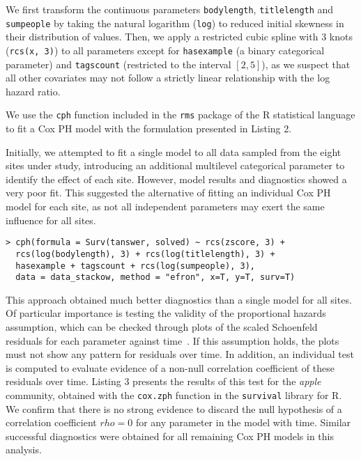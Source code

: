 \documentclass{chi2012}
\begin{document}
We first transform the continuous parameters
\texttt{bodylength}, \texttt{titlelength} and \texttt{sumpeople} by taking the natural 
logarithm (\texttt{log}) to reduced initial skewness in their distribution of values.
Then, we apply a restricted cubic spline with 3 knots (\texttt{rcs(x, 3)}) to all
parameters except for \texttt{hasexample} (a binary categorical parameter) and
\texttt{tagscount} (restricted to the interval $[2, 5]$), as we suspect that all
other covariates may not follow a strictly linear relationship with the log hazard
ratio.

We use the \texttt{cph} function included in the \texttt{rms} package
of the R statistical language to fit a Cox PH model with the 
formulation presented in Listing 2.

Initially, we attempted to fit a single model to all data sampled from the eight sites under study, introducing an additional multilevel categorical parameter to
identify the effect of each site. However, model results and diagnostics showed
a very poor fit. This suggested the alternative of fitting an individual Cox PH
model for each site, as not all independent parameters may exert the same influence
for all sites.

\begin{lstlisting}[breaklines=true,
caption={Model formulation to fit a Cox PH model for each site using the 
\texttt{cph} function in the \texttt{rms} package in R.},
basicstyle=\ttfamily\scriptsize,
frame=lines,
showtabs=false,
showspaces=false,
showstringspaces=false,
captionpos=b]
> cph(formula = Surv(tanswer, solved) ~ rcs(zscore, 3) +
  rcs(log(bodylength), 3) + rcs(log(titlelength), 3) + 
  hasexample + tagscount + rcs(log(sumpeople), 3),
  data = data_stackow, method = "efron", x=T, y=T, surv=T)
\end{lstlisting}

This approach obtained much better diagnostics than a single model for all sites.
Of particular importance is testing the validity of the proportional hazards
assumption, which can be checked through plots of the scaled Schoenfeld
residuals for each parameter against time~\cite{mills2011}. If this assumption
holds, the plots must not show any pattern for residuals over time. In addition,
an individual test is computed to evaluate evidence of a non-null correlation
coefficient of these residuals over time. Listing 3 presents the results of this
test for the \textit{apple} community, obtained with the \texttt{cox.zph} function
in the \texttt{survival} library for R. We confirm that there is no strong evidence
to discard the null hypothesis of a correlation coefficient $rho=0$ for any
parameter in the model with time. Similar successful diagnostics were obtained for all 
remaining Cox PH models in this analysis.
\end{document}

